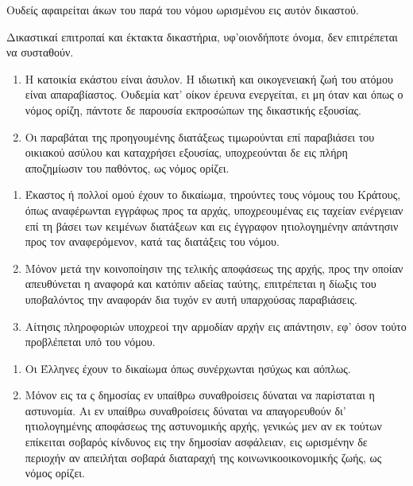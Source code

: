 \documentclass[twoside, a4paper, 10pt]{article}
\begin{document}
\begin{multicols}{2}
\begin{enumerate}
\begin{BigQuote}
	Ουδείς αφαιρείται άκων του παρά του νόμου ωρισμένου εις αυτόν δικαστού.

	Δικαστικαί επιτροπαί και έκτακτα δικαστήρια, υφ'οιονδήποτε όνομα, δεν επιτρέπεται να συσταθούν.

\begin{enumerate}
  \item[1.] Η κατοικία εκάστου είναι άσυλον. Η ιδιωτική και οικογενειακή ζωή του ατόμου είναι απαραβίαστος. Ουδεμία κατ' οίκον έρευνα ενεργείται, ει μη όταν και όπως ο νόμος ορίζη, πάντοτε δε παρουσία εκπροσώπων της δικαστικής εξουσίας.
  \item[2.] Οι παραβάται της προηγουμένης διατάξεως τιμωρούνται επί παραβιάσει του οικιακού ασύλου και καταχρήσει εξουσίας, υποχρεούνται δε εις πλήρη αποζημίωσιν του παθόντος, ως νόμος ορίζει.
\end{enumerate}

\begin{enumerate}
  \item[1.] Έκαστος ή πολλοί ομού έχουν το δικαίωμα, τηρούντες τους νόμους του Κράτους, όπως αναφέρωνται εγγράφως προς τα αρχάς, υποχρεουμένας εις ταχείαν ενέργειαν επί τη βάσει των κειμένων διατάξεων και εις έγγραφον ητιολογημένην απάντησιν προς τον αναφερόμενον, κατά τας διατάξεις του νόμου.
  \item[2.] Μόνον μετά την κοινοποίησιν της τελικής αποφάσεως της αρχής, προς την οποίαν απευθύνεται η αναφορά και κατόπιν αδείας ταύτης, επιτρέπεται η δίωξις του υποβαλόντος την αναφοράν δια τυχόν εν αυτή υπαρχούσας παραβιάσεις.
  \item[3.] Αίτησις πληροφοριών υποχρεοί την αρμοδίαν αρχήν εις απάντησιν, εφ' όσον τούτο προβλέπεται υπό του νόμου.
\end{enumerate}

\begin{enumerate}
  \item[1.] Οι Έλληνες έχουν το δικαίωμα όπως συνέρχωνται ησύχως και αόπλως.
  \item[2.] Μόνον εις τα ς δημοσίας εν υπαίθρω συναθροίσεις δύναται να παρίσταται η αστυνομία. Αι εν υπαίθρω συναθροίσεις δύναται να απαγορευθούν δι' ητιολογημένης αποφάσεως της αστυνομικής αρχής, γενικώς μεν αν εκ τούτων επίκειται σοβαρός κίνδυνος εις την δημοσίαν ασφάλειαν, εις ωρισμένην δε περιοχήν αν απειλήται σοβαρά διαταραχή της κοινωνικοοικονομικής ζωής, ως νόμος ορίζει.
\end{enumerate}


\end{BigQuote}
\end{enumerate}
\end{multicols}
\end{document}
